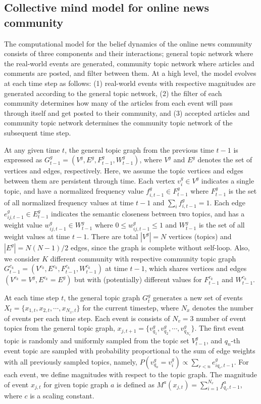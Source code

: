 \documentclass{nature}
\begin{document}
\begin{methods}

\subsection{Collective mind model for online news community}

The computational model for the belief dynamics of the online news community consists of three components and their interactions; general topic network where the real-world events are generated, community topic network where articles and comments are posted, and filter between them. At a high level, the model evolves at each time step as follows: (1) real-world events with respective magnitudes are generated according to the general topic network, (2) the filter of each community determines how many of the articles from each event will pass through itself and get posted to their community, and (3) accepted articles and community topic network determines the community topic network of the subsequent time step.

At any given time $t$, the general topic graph from the previous time $t-1$ is expressed as $G^g_{t-1} = (V^g, E^g, F_{t-1}^g, W_{t-1}^g)$, where $V^g$ and $E^g$ denotes the set of vertices and edges, respectively. Here, we assume the topic vertices and edges between them are persistent through time. Each vertex $v_{i}^g \in V^g$ indicates a single topic, and have a normalized frequency value $f_{i,{t-1}}^g \in F_{t-1}^g$ where $F_{t-1}^g$ is the set of all normalized frequency values at time ${t-1}$ and $\sum_i f^g_{i, t-1} = 1$. Each edge $e_{ij,{t-1}}^g \in E_{t-1}^g$ indicates the semantic closeness between two topics, and has a weight value $w_{ij,{t-1}}^g \in W_{t-1}^g$ where $0 \leq w_{ij,{t-1}}^g \leq 1$ and $W_{t-1}^g$ is the set of all weight values at time ${t-1}$. There are total $|V^g| = N$ vertices (topics) and $|E^g| = N(N-1)/2$ edges, since the graph is complete without self-loop. Also, we consider $K$ different community with respective community topic graph $G^{c_k}_{t-1} = (V^{c_k}, E^{c_k}, F_{t-1}^{c_k}, W_{t-1}^{c_k})$ at time ${t-1}$, which shares vertices and edges $(V^{c_k} = V^g, E^{c_k} = E^g)$ but with (potentially) different values for $F_{t-1}^{c_k}$ and $W_{t-1}^{c_k}$.

At each time step $t$, the general topic graph $G^g_t$ generates a new set of events $X_{t}=\{x_{1, t}, \allowbreak x_{2, t}, \cdots, x_{N_x, t}\}$ for the current timestep, where $N_x$ denotes the number of events per each time step. Each event is consists of $N_{v}=3$ number of event topics from the general topic graph, $x_{j, t+1} = \{v_{q_1}^g, v_{q_2}^g, \cdots, v_{q_{N_{v}}}^g\}$. The first event topic is randomly and uniformly sampled from the topic set $V_{t-1}^g$, and $q_n$-th event topic are sampled with probability proportional to the sum of edge weights with all previously sampled topics, namely, $P(v_{q_n}^g = v_{i}^g) \propto \sum_{r<n} e_{iq_r,{t-1}}^g$. For each event, we define magnitudes with respect to the topic graph. The magnitude of event $x_{j, t}$ for given topic graph $a$ is defined as $M^a(x_{j, t}) = \sum_{i=1}^{N_{v}} f_{q_i,t-1}^a$, where $c$ is a scaling constant.


\end{methods}
\end{document}
